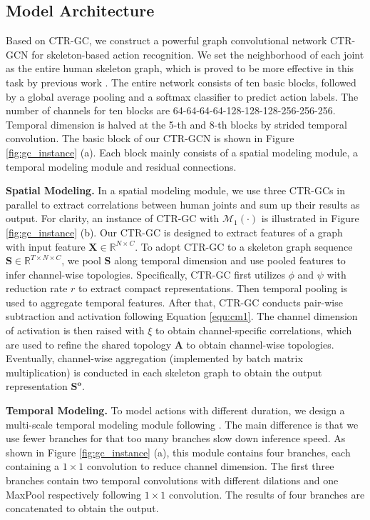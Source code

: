 \documentclass[10pt,twocolumn,letterpaper]{article}
\begin{document}
\subsection{Model Architecture}
\label{sec:model_architecture}
Based on CTR-GC, we construct a powerful graph convolutional network CTR-GCN for skeleton-based action recognition. We set the neighborhood of each joint as the entire human skeleton graph, which is proved to be more effective in this task by previous work \cite{cheng2020skeleton,shi2019two}. The entire network consists of ten basic blocks, followed by a global average pooling and a softmax classifier to predict action labels. The number of channels for ten blocks are 64-64-64-64-128-128-128-256-256-256. Temporal dimension is halved at the 5-th and 8-th blocks by strided temporal convolution. The basic block of our CTR-GCN is shown in Figure \ref{fig:gc_instance} (a). Each block mainly consists of a spatial modeling module, a temporal modeling module and residual connections. 

\noindent \textbf{Spatial Modeling.} In a spatial modeling module, we use three CTR-GCs in parallel to extract correlations between human joints and sum up their results as output. For clarity, an instance of CTR-GC with $\mathcal{M}_1(\cdot)$ is illustrated in Figure \ref{fig:gc_instance} (b). Our CTR-GC is designed to extract features of a graph with input feature $\mathbf{X} \in \mathbb{R}^{N \times C}$. To adopt CTR-GC to a skeleton graph sequence $\mathbf{S} \in \mathbb{R}^{T\times N\times C}$, we pool $\mathbf{S}$ along temporal dimension and use pooled features to infer channel-wise topologies. Specifically, CTR-GC first utilizes $\phi$ and $\psi$ with reduction rate $r$ to extract compact representations. Then temporal pooling is used to aggregate temporal features. After that, CTR-GC conducts pair-wise subtraction and activation following Equation \ref{equ:cm1}. The channel dimension of activation is then raised with $\xi$ to obtain channel-specific correlations, which are used to refine the shared topology $\mathbf{A}$ to obtain channel-wise topologies. Eventually, channel-wise aggregation (implemented by batch matrix multiplication) is conducted in each skeleton graph to obtain the output representation $\mathbf{S^o}$.

\noindent \textbf{Temporal Modeling.} To model actions with different duration, we design a multi-scale temporal modeling module following \cite{liu2020disentangling}. The main difference is that we use fewer branches for that too many branches slow down inference speed. As shown in Figure \ref{fig:gc_instance} (a), this module contains four branches, each containing a $1 \times 1$ convolution to reduce channel dimension. The first three branches contain two temporal convolutions with different dilations and one MaxPool respectively following $1\times 1$ convolution. The results of four branches are concatenated to obtain the output.
\end{document}
